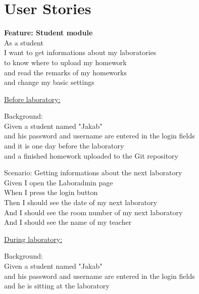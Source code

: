 \chapter{User Stories}
\label{user-stories}

\textbf{Feature: Student module}\\ \hspace*{1cm}
As a student\\ \hspace*{1cm}
I want to get informations about my laboratories\\ \hspace*{1cm}
to know where to upload my homework\\ \hspace*{1cm}
and read the remarks of my homeworks\\ \hspace*{1cm}
and change my basic settings

\underline{Before laboratory:}

Background:\\ \hspace*{1cm}
Given a student named "Jakab"\\ \hspace*{1cm}
and his password and username are entered in the login fields\\ \hspace*{1cm}
and it is one day before the laboratory\\ \hspace*{1cm}
and a finished homework uploaded to the Git repository

Scenario: Getting informations about the next laboratory\\ \hspace*{1cm}
Given I open the Laboradmin page\\ \hspace*{1cm}
When I press the login button\\ \hspace*{1cm}
Then I should see the date of my next laboratory\\ \hspace*{1cm}
And  I should see the room number of my next laboratory\\ \hspace*{1cm}
And I should see the name of my teacher

\underline{During laboratory:}

Background:\\ \hspace*{1cm}
Given a student named "Jakab"\\ \hspace*{1cm}
and his password and username are entered in the login fields\\ \hspace*{1cm}
and he is sitting at the laboratory

